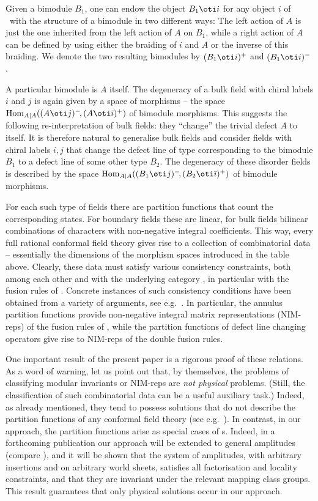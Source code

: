 Given a bimodule $B_1$, one can endow the object $B_1\oti i$ for any object 
$i$ of \calc\ with the structure of a bimodule in two different ways: The 
left action of $A$ is just the one inherited from the left action of $A$ on
$B_1$, while a right action of $A$ can be defined by using either the
braiding of $i$ and $A$ or the inverse of this braiding. We denote the 
two resulting bimodules by $(B_1\oti i)^+$ and $(B_1\oti i)^-$.

A particular bimodule is $A$ itself. The degeneracy of a bulk field
with chiral labels $i$ and $j$ is again given by a space of morphisms -- 
the space ${\rm Hom}_{A|A}((A\oti j)^-\!,(A\oti\bar\imath)^+)$ of bimodule 
morphisms. This suggests the following re-interpretation of bulk fields: 
they ``change'' the trivial defect $A$ to itself. It is therefore natural 
to generalise bulk fields and consider fields with chiral
labels $i,j$ that change the defect line of type corresponding to the 
bimodule $B_1$ to a defect line of some other type $B_2$. The degeneracy 
of these disorder fields is described by the space ${\rm Hom}_{A|A}
((B_1\oti j)^-\!,(B_2\oti\bar\imath)^+)$ of bimodule morphisms.

\medskip

For each such type of fields there are partition functions that count the
corresponding states. For boundary fields these are linear, for bulk fields
bilinear combinations of characters with non-negative integral coefficients.
This way, every full rational conformal field theory gives rise to a collection
of combinatorial data -- essentially the dimensions of the morphism spaces
introduced in the table above. Clearly, these data must satisfy various
consistency constraints, both among each other and with the underlying 
category \calc, in particular with the fusion rules of \calc. 
Concrete instances of such consistency conditions have been obtained
from a variety of arguments, see e.g.\
\cite{dore3,prss3,sasT2,boev3,boek2,bppz2,pezu4,pezu5,scst,fuSc16,gann17}.
In particular, the annulus
partition functions provide non-negative integral matrix representations
(NIM-reps) of the fusion rules of \calc, while the partition functions
of defect line changing operators give rise to NIM-reps of the double
fusion rules. 

One important result of the present paper is a rigorous proof of these 
relations. As a word of warning, let us point out that, by themselves,
the problems of classifying modular invariants or NIM-reps are {\em not
physical\/} problems. (Still, the classification of such combinatorial 
data can be a useful auxiliary task.) Indeed, as already mentioned,
they tend to possess solutions 
that do not describe the partition functions of any conformal field theory 
(see e.g.\ \cite{vers,scya5,fusS,gann17}). In contrast, in our approach, 
the partition functions arise as special cases of \corfu s. Indeed,
in a forthcoming publication our approach will be extended to general 
amplitudes (compare \cite{fuRs}), and it will be shown that the system
of amplitudes, with arbitrary insertions and on arbitrary world sheets, 
satisfies all factorisation and locality constraints, and that they are 
invariant under the relevant mapping class groups. This result 
guarantees that only physical solutions occur in our approach.

